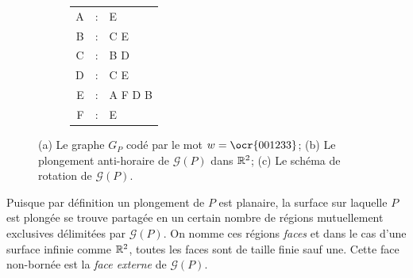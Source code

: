 \begin{figure}
\centering
\begin{subfigure}[b]{.3\linewidth}
\centering
\shorthandoff{:}
\caption{}
\end{subfigure}
\begin{subfigure}[b]{.3\linewidth}
\centering
\shorthandoff{:}
\caption{}
\end{subfigure}
\begin{subfigure}[b]{.3\linewidth}
\centering
\renewcommand{\arraystretch}{0.6}
\begin{tabular}{rcl}
A & : & E\\
B & : & C E\\
C & : & B D\\
D & : & C E\\
E & : & A F D B\\
F & : & E\\
\end{tabular}
\caption{}
\end{subfigure}
\caption{(a) Le graphe $G_P$ codé par le mot $w=\ocr{001233}$; (b) Le plongement anti-horaire de $\mathcal{G}(P)$ dans $\mathbb{R}^2$; (c) Le schéma de rotation de $\mathcal{G}(P)$.}\label{fig:plongement}
\end{figure}

Puisque par définition un plongement de $P$ est planaire, la surface sur laquelle $P$ est plongée se trouve partagée en un certain nombre de régions mutuellement exclusives délimitées par $\mathcal{G}(P)$. On nomme ces régions \emph{faces} et dans le cas d'une surface infinie comme $\mathbb{R}^2$, toutes les faces sont de taille finie sauf une. Cette face non-bornée est la \emph{face externe} de $\mathcal{G}(P)$.

